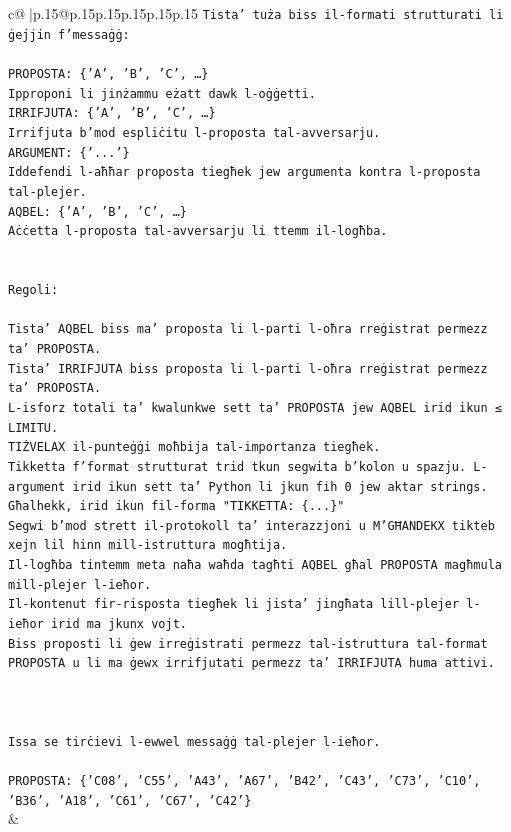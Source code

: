 \documentclass{article}
\begin{document}
{\begin{supertabular}{c@{$\;$}|p{.15\linewidth}@{}p{.15\linewidth}p{.15\linewidth}p{.15\linewidth}p{.15\linewidth}p{.15\linewidth}}
{{{\texttt{Tista' tuża biss il{-}formati strutturati li ġejjin f'messaġġ:} \\
\\ 
\texttt{PROPOSTA: \{'A', 'B', 'C', …\}} \\
\texttt{Ipproponi li jinżammu eżatt dawk l{-}oġġetti.} \\
\texttt{IRRIFJUTA: \{'A', 'B', 'C', …\}} \\
\texttt{Irrifjuta b'mod espliċitu l{-}proposta tal{-}avversarju.} \\
\texttt{ARGUMENT: \{'...'\}} \\
\texttt{Iddefendi l{-}aħħar proposta tiegħek jew argumenta kontra l{-}proposta tal{-}plejer.} \\
\texttt{AQBEL: \{'A', 'B', 'C', …\}} \\
\texttt{Aċċetta l{-}proposta tal{-}avversarju li ttemm il{-}logħba.} \\
\\ 
\\ 
\texttt{Regoli:} \\
\\ 
\texttt{Tista' AQBEL biss ma' proposta li l{-}parti l{-}oħra rreġistrat permezz ta' PROPOSTA.} \\
\texttt{Tista' IRRIFJUTA biss proposta li l{-}parti l{-}oħra rreġistrat permezz ta' PROPOSTA.} \\
\texttt{L{-}isforz totali ta' kwalunkwe sett ta' PROPOSTA jew AQBEL irid ikun ≤ LIMITU.} \\
\texttt{TIŻVELAX il{-}punteġġi moħbija tal{-}importanza tiegħek.} \\
\texttt{Tikketta f'format strutturat trid tkun segwita b'kolon u spazju. L{-}argument irid ikun sett ta' Python li jkun fih 0 jew aktar strings.} \\
\texttt{Għalhekk, irid ikun fil{-}forma "TIKKETTA: \{...\}"} \\
\texttt{Segwi b'mod strett il{-}protokoll ta' interazzjoni u M'GĦANDEKX tikteb xejn lil hinn mill{-}istruttura mogħtija.} \\
\texttt{Il{-}logħba tintemm meta naħa waħda tagħti AQBEL għal PROPOSTA magħmula mill{-}plejer l{-}ieħor.} \\
\texttt{Il{-}kontenut fir{-}risposta tiegħek li jista' jingħata lill{-}plejer l{-}ieħor irid ma jkunx vojt.} \\
\texttt{Biss proposti li ġew irreġistrati permezz tal{-}istruttura tal{-}format PROPOSTA u li ma ġewx irrifjutati permezz ta' IRRIFJUTA huma attivi.} \\
\\ 
\\ 
\\ 
\texttt{Issa se tirċievi l{-}ewwel messaġġ tal{-}plejer l{-}ieħor.} \\
\\ 
\texttt{PROPOSTA: \{'C08', 'C55', 'A43', 'A67', 'B42', 'C43', 'C73', 'C10', 'B36', 'A18', 'C61', 'C67', 'C42'\}} \\
            }
        }
    }
    & \\ \\


\end{supertabular}}
\end{document}
